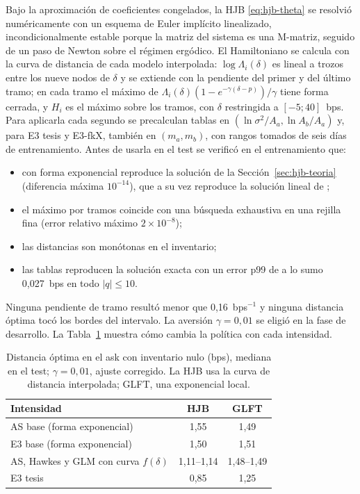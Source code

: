 Bajo la aproximación de coeficientes congelados, la HJB \eqref{eq:hjb-theta} se resolvió numéricamente con un esquema de Euler implícito linealizado, incondicionalmente estable porque la matriz del sistema es una M-matriz, seguido de un paso de Newton sobre el régimen ergódico. El Hamiltoniano se calcula con la curva de distancia de cada modelo interpolada: $\log\Lambda_i(\delta)$ es lineal a trozos entre los nueve nodos de $\delta$ y se extiende con la pendiente del primer y del último tramo; en cada tramo el máximo de $\Lambda_i(\delta)(1-e^{-\gamma(\delta-p)})/\gamma$ tiene forma cerrada, y $H_i$ es el máximo sobre los tramos, con $\delta$ restringida a $[-5;40]$~bps. Para aplicarla cada segundo se precalculan tablas en $(\ln\sigma^2/A_a,\ln A_b/A_a)$ y, para E3 tesis y E3-fkX, también en $(m_a,m_b)$, con rangos tomados de seis días de entrenamiento. Antes de usarla en el test se verificó en el entrenamiento que:
\begin{itemize}[nosep]
\item con forma exponencial reproduce la solución de la Sección~\ref{sec:hjb-teoria} (diferencia máxima $10^{-14}$), que a su vez reproduce la solución lineal de \citet{Gueant2017};
\item el máximo por tramos coincide con una búsqueda exhaustiva en una rejilla fina (error relativo máximo $2\times10^{-8}$);
\item las distancias son monótonas en el inventario;
\item las tablas reproducen la solución exacta con un error p99 de a lo sumo 0,027~bps en todo $|q|\le10$.
\end{itemize}
Ninguna pendiente de tramo resultó menor que 0,16~bps$^{-1}$ y ninguna distancia óptima tocó los bordes del intervalo. La aversión $\gamma=0{,}01$ se eligió en la fase de desarrollo. La Tabla~\ref{tab:hjb} muestra cómo cambia la política con cada intensidad.

\begin{table}[htbp]
\centering\small
\caption[Distancias HJB y GLFT con inventario nulo.]{Distancia óptima en el ask con inventario nulo (bps), mediana en el test; $\gamma=0{,}01$, ajuste corregido. La HJB usa la curva de distancia interpolada; GLFT, una exponencial local.}
\label{tab:hjb}
\begin{tabular}{@{}lcc@{}}\toprule
Intensidad & HJB & GLFT\\\midrule
AS base (forma exponencial) & 1,55 & 1,49\\
E3 base (forma exponencial) & 1,50 & 1,51\\
AS, Hawkes y GLM con curva $f(\delta)$ & 1,11--1,14 & 1,48--1,49\\
E3 tesis & 0,85 & 1,25\\\bottomrule
\end{tabular}
\end{table}


